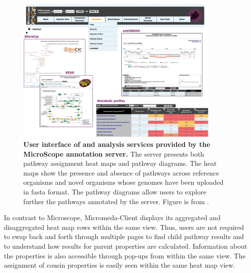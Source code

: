 \begin{figure}[!ht]
 \centering
	\includegraphics[width=0.9\textwidth]{media/microscope.png}
	 \caption[User interface of and analysis services provided by the MicroScope 
annotation server.]{\textbf{User interface of and analysis services provided by 
the MicroScope annotation server.} The server presents both pathway assignment 
heat maps and pathway diagrams. The heat maps show the presence and absence of 
pathways across reference organisms and novel organisms whose genomes have been 
uploaded in \gls{fasta} format. The pathway diagrams allow users to explore 
further the pathways annotated by the server. Figure is from 
\cite{vallenet2016microscope}.}
	 \label{fig:microscope}
\end{figure}

In contrast to Microscope, Micromeda-Client displays its aggregated and 
disaggregated heat map rows within the same view. Thus, users are not required 
to swap back and forth through multiple pages to find child pathway results and 
to understand how results for parent properties are calculated. Information 
about the properties is also accessible through pop-ups from within the same 
view. The assignment of cousin properties is easily seen within the same heat 
map view.

